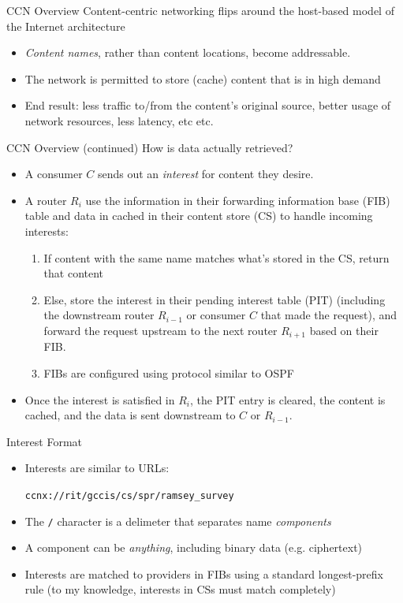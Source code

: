 \documentclass[handout]{beamer}
\begin{document}
\begin{frame}{CCN Overview}
	Content-centric networking flips around the host-based model of the Internet architecture
	\begin{itemize}
		\item \emph{Content names}, rather than content locations, become addressable. 
		\item The network is permitted to store (cache) content that is in high demand
		\item End result: less traffic to/from the content's original source, better usage of network resources, less latency, etc etc.
	\end{itemize}
\end{frame}

\begin{frame}{CCN Overview (continued)}
	How is data actually retrieved? 
	\begin{itemize}
		\item A consumer $C$ sends out an \emph{interest} for content they desire.
		\item A router $R_i$ use the information in their forwarding information base (FIB) table and data in cached in their content store (CS) to handle incoming interests:
		\begin{enumerate}
			\item If content with the same name matches what's stored in the CS, return that content
			\item Else, store the interest in their pending interest table (PIT) (including the downstream router $R_{i-1}$ or consumer $C$ that made the request), and forward the request upstream to the next router $R_{i+1}$ based on their FIB.
			\item FIBs are configured using protocol similar to OSPF
		\end{enumerate}
		\item Once the interest is satisfied in $R_i$, the PIT entry is cleared, the content is cached, and the data is sent downstream to $C$ or $R_{i-1}$. 
 	\end{itemize}
\end{frame}

\begin{frame}{Interest Format}
	\begin{itemize}
		\item Interests are similar to URLs: 
		\begin{center}
			{\tt ccnx://rit/gccis/cs/spr/ramsey\_survey}
		\end{center}
		\item The {\tt /} character is a delimeter that separates name \emph{components}
		\item A component can be \emph{anything}, including binary data (e.g. ciphertext)
		\item Interests are matched to providers in FIBs using a standard longest-prefix rule (to my knowledge, interests in CSs must match completely)
	\end{itemize}
\end{frame}
\end{document}
